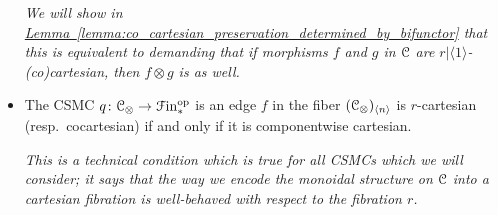 \documentclass[main.tex]{subfiles}
\begin{document}
\begin{definition}
\begin{itemize}
      \textit{We will show in \hyperref[lemma:co_cartesian_preservation_determined_by_bifunctor]{Lemma~\ref*{lemma:co_cartesian_preservation_determined_by_bifunctor}} that this is equivalent to demanding that if morphisms $f$ and $g$ in $\mathcal{C}$ are $r|\langle 1 \rangle$-(co)cartesian, then $f \otimes g$ is as well.}

    \item The CSMC $q\colon \mathcal{C}_{\otimes} \to \mathcal{F}\mathrm{in}_{*}^{\mathrm{op}}$ is  an edge $f$ in the fiber $(\mathcal{C}_{\otimes})_{\langle n \rangle}$ is $r$-cartesian (resp.\ cocartesian) if and only if it is componentwise cartesian.

      \textit{This is a technical condition which is true for all CSMCs which we will consider; it says that the way we encode the monoidal structure on $\mathcal{C}$ into a cartesian fibration is well-behaved with respect to the fibration $r$.}
  \end{itemize}
\end{definition}
\end{document}
